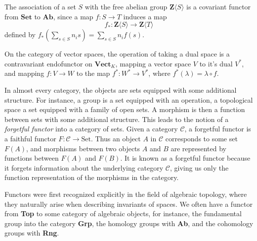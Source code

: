 \begin{example}
    The association of a set $S$ with the free abelian group $\mathbf{Z}\langle S \rangle$ is a covariant functor from $\mathbf{Set}$ to $\mathbf{Ab}$, since a map $f: S \to T$ induces a map
    \[ f_*: \mathbf{Z} \langle S \rangle \to \mathbf{Z} \langle T \rangle \]
    defined by $f_*(\sum_{s \in S} n_i s) = \sum_{s \in S} n_i f(s)$.
\end{example}

\begin{example}
    On the category of vector spaces, the operation of taking a dual space is a contravariant endofunctor on $\textbf{Vect}_K$, mapping a vector space $V$ to it's dual $V^*$, and mapping $f: V \to W$ to the map $f^*: W^* \to V^*$, where $f^*(\lambda) = \lambda \circ f$.
\end{example}

\begin{example}
    In almost every category, the objects are sets equipped with some additional structure. For instance, a group is a set equipped with an operation, a topological space a set equipped with a family of open sets. A morphism is then a function between sets with some additional structure. This leads to the notion of a {\it forgetful functor} into a category of sets. Given a category $\mathcal{C}$, a forgetful functor is a faithful functor $F: \mathcal{C} \to \text{Set}$. Thus an object $A$ in $\mathcal{C}$ corresponds to some set $F(A)$, and morphisms between two objects $A$ and $B$ are represented by functions between $F(A)$ and $F(B)$. It is known as a forgetful functor because it forgets information about the underlying category $\mathcal{C}$, giving us only the function representation of the morphisms in the category.
\end{example}

\begin{example}
    Functors were first recognized explicitly in the field of algebraic topology, where they naturally arise when describing invariants of spaces. We often have a functor from {\bf Top} to some category of algebraic objects, for instance, the fundamental group into the category {\bf Grp}, the homology groups with {\bf Ab}, and the cohomology groups with {\bf Rng}.
\end{example}

